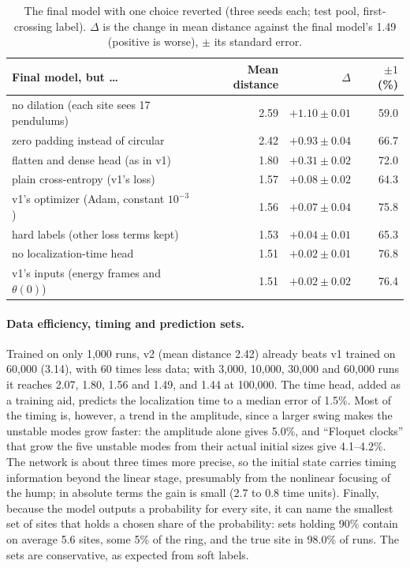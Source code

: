 \documentclass[11pt]{article}
\begin{document}
\begin{table}[htbp]
  \centering
  \caption{The final model with one choice reverted (three seeds each; test pool, first-crossing label). $\Delta$ is the change in mean distance against the final model's 1.49 (positive is worse), $\pm$ its standard error.}
  \label{tab:loo}
  \small
  \begin{tabular}{@{}lrrr@{}}
    \toprule
    Final model, but \dots & Mean distance & $\Delta$ & $\pm1$ (\%) \\
    \midrule
    no dilation (each site sees 17 pendulums) & 2.59 & $+1.10\pm0.01$ & 59.0 \\
    zero padding instead of circular & 2.42 & $+0.93\pm0.04$ & 66.7 \\
    flatten and dense head (as in v1) & 1.80 & $+0.31\pm0.02$ & 72.0 \\
    plain cross-entropy (v1's loss) & 1.57 & $+0.08\pm0.02$ & 64.3 \\
    v1's optimizer (Adam, constant $10^{-3}$) & 1.56 & $+0.07\pm0.04$ & 75.8 \\
    hard labels (other loss terms kept) & 1.53 & $+0.04\pm0.01$ & 65.3 \\
    no localization-time head & 1.51 & $+0.02\pm0.01$ & 76.8 \\
    v1's inputs (energy frames and $\theta(0)$) & 1.51 & $+0.02\pm0.02$ & 76.4 \\
    \bottomrule
  \end{tabular}
\end{table}

\paragraph{Data efficiency, timing and prediction sets.} Trained on only 1,000 runs, v2 (mean distance 2.42) already beats v1 trained on 60,000 (3.14), with 60 times less data; with 3,000, 10,000, 30,000 and 60,000 runs it reaches 2.07, 1.80, 1.56 and 1.49, and 1.44 at 100,000. The time head, added as a training aid, predicts the localization time to a median error of 1.5\%. Most of the timing is, however, a trend in the amplitude, since a larger swing makes the unstable modes grow faster: the amplitude alone gives 5.0\%, and ``Floquet clocks'' that grow the five unstable modes from their actual initial sizes give 4.1--4.2\%. The network is about three times more precise, so the initial state carries timing information beyond the linear stage, presumably from the nonlinear focusing of the hump; in absolute terms the gain is small (2.7 to 0.8 time units). Finally, because the model outputs a probability for every site, it can name the smallest set of sites that holds a chosen share of the probability: sets holding 90\% contain on average 5.6 sites, some 5\% of the ring, and the true site in 98.0\% of runs. The sets are conservative, as expected from soft labels.
\end{document}
